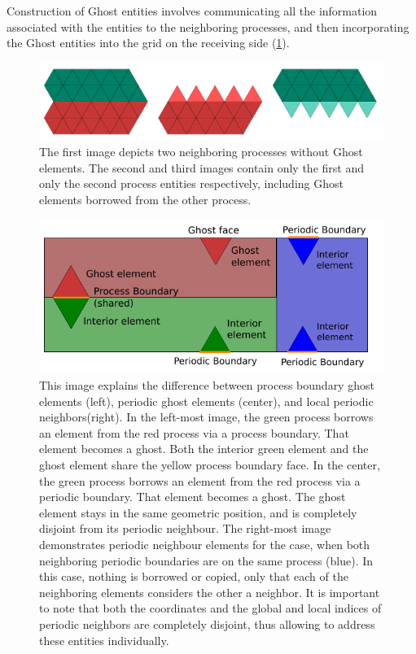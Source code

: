 \noindent
Construction of Ghost entities involves communicating all the information associated with the entities to the neighboring processes, and then incorporating the Ghost entities into the grid on the receiving side (\cref{fig:impl:ghostelements}). \\

\begin{figure}
    \centering
	\includegraphics[scale=0.5]{images/parallel-ghost-elements}
	\caption{The first image depicts two neighboring processes without Ghost elements. The second and third images contain only the first and only the second process entities respectively, including Ghost elements borrowed from the other process. }
	\label{fig:impl:ghostelements}
\end{figure}

\begin{figure}
    \centering
	\includegraphics[scale=1.5]{images/periodic-vs-process-boundary}
	\captionsetup{width = 0.8\textwidth}
	\caption{This image explains the difference between process boundary ghost elements (left), periodic ghost elements (center), and local periodic neighbors(right). In the left-most image, the green process borrows an element from the red process via a process boundary. That element becomes a ghost. Both the interior green element and the ghost element share the yellow process boundary face. In the center, the green process borrows an element from the red process via a periodic boundary. That element becomes a ghost. The ghost element stays in the same geometric position, and is completely disjoint from its periodic neighbour. The right-most image demonstrates periodic neighbour elements for the case, when both neighboring periodic boundaries are on the same process (blue). In this case, nothing is borrowed or copied, only that each of the neighboring elements considers the other a neighbor. It is important to note that both the coordinates and the global and local indices of periodic neighbors are completely disjoint, thus allowing to address these entities individually. }
	\label{fig:impl:periodicvsprocessboundary}
\end{figure}


